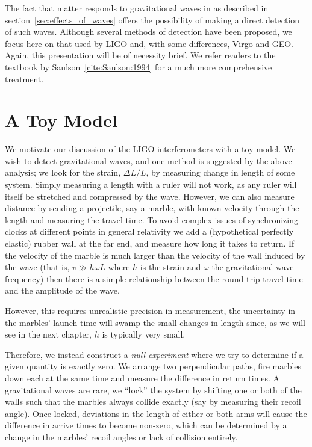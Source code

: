 The fact that matter responds to gravitational waves in as described
in section~\ref{sec:effects_of_waves} offers the possibility of making
a direct detection of such waves.  Although several methods of
detection have been proposed, we focus here on that used by LIGO and,
with some differences, Virgo and GEO.  Again, this presentation will
be of necessity brief.  We refer readers to the textbook by
Saulson~\ref{cite:Saulson:1994} for a much more comprehensive
treatment.

\section{A Toy Model}

We motivate our discussion of the LIGO interferometers with a toy
model.  We wish to detect gravitational waves, and one method is
suggested by the above analysis; we look for the strain, $\Delta L/L$,
by measuring change in length of some system.  Simply measuring a
length with a ruler will not work, as any ruler will itself be
stretched and compressed by the wave.  However, we can also measure
distance by sending a projectile, say a marble, with known
velocity through the length and measuring the travel time.  To avoid
complex issues of synchronizing clocks at different points in general
relativity we add a (hypothetical perfectly elastic) rubber wall at
the far end, and measure how long it takes to return.  If the velocity
of the marble is much larger than the velocity of the wall induced by
the wave (that is, $v \gg h \omega L$ where $h$ is the strain and
$\omega$ the gravitational wave frequency) then there is a simple
relationship between the round-trip travel time and the amplitude of
the wave.

However, this requires unrealistic precision in measurement, the
uncertainty in the marbles' launch time will swamp the small changes in 
length since, as we will see in the next chapter, $h$ is typically
very small.

Therefore, we instead construct a \emph{null experiment} where we try
to determine if a given quantity is exactly zero.  We arrange two
perpendicular paths, fire marbles down each at the same time and
measure the difference in return times.  A gravitational waves are
rare, we ``lock'' the system by shifting one or both of the walls such
that the marbles always collide exactly (say by measuring their recoil
angle).  Once locked, deviations in the length of either or both arms
will cause the difference in arrive times to become non-zero, which
can be determined by a change in the marbles' recoil angles or lack of
collision entirely.

